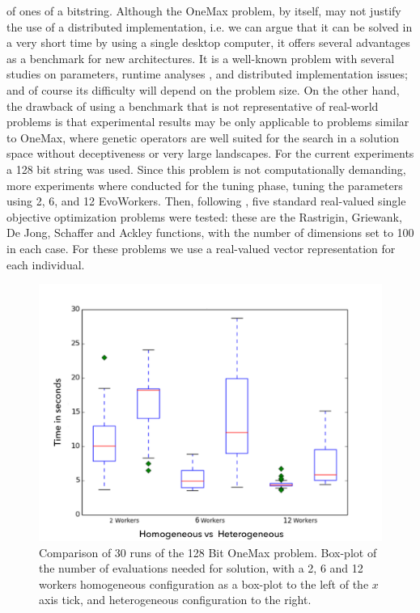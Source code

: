 \documentclass[conference]{IEEEtran}
\begin{document}
of ones of a bitstring. Although the OneMax problem, by itself, may not justify the use of a distributed
implementation, i.e. we can argue that it can be solved in a very short time by using a
single desktop computer, it offers several advantages as a
benchmark for new architectures. It is a well-known problem with several
studies on parameters,  runtime analyses \cite{DBLP:journals/corr/MereloGVB15},
and distributed implementation
issues; and of course its difficulty will depend on the problem size. On the other hand, the drawback of using a benchmark that is not representative of
real-world problems is that experimental results may be only applicable to
problems similar to OneMax, where genetic operators are well suited for the
search in a solution space without deceptiveness or very large landscapes.
For the current experiments a 128 bit string was used. Since this
problem is not computationally demanding, more experiments where conducted for the tuning phase,
tuning the parameters using 2, 6, and 12 EvoWorkers. Then, following \cite{fuku1},
five standard real-valued single objective optimization problems were
tested: these are the Rastrigin, Griewank, De Jong, Schaffer  and
Ackley functions,
with the number of dimensions set to 100 in each case. For these problems we use a real-valued vector
representation for each individual.

  \begin{figure}[h!tb]
    \centering
        \includegraphics[width=12cm]{img/one_max_comp.png}
    \caption{Comparison of 30 runs of the 128 Bit OneMax problem.
    Box-plot of the number of evaluations needed for solution, with a 2, 6 and 12 workers
    homogeneous configuration as a box-plot to the left of the $x$ axis
    tick, and heterogeneous configuration to the right.
    }
    \label{fig:comp-onemax}
  \end{figure}
%
\end{document}
